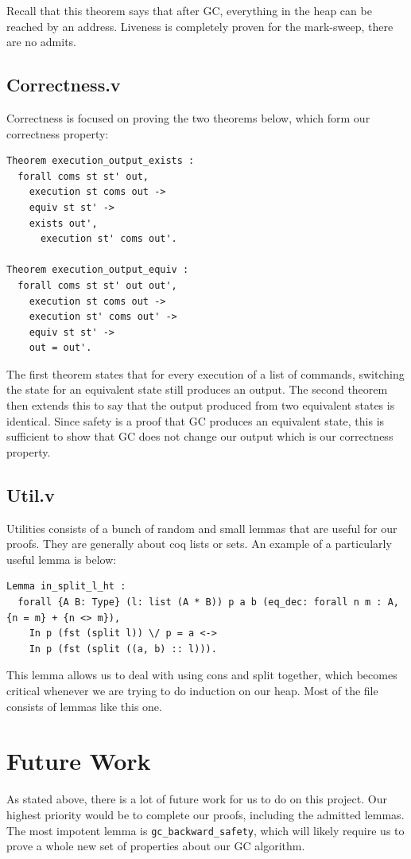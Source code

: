 \documentclass{article}
\begin{document}
Recall that this theorem says that after GC, everything in the heap can be reached by an address. Liveness is completely proven for the mark-sweep, there are no admits.

\subsection{Correctness.v}
Correctness is focused on proving the two theorems below, which form our correctness property:

\begin{lstlisting}
Theorem execution_output_exists :
  forall coms st st' out,
    execution st coms out ->
    equiv st st' ->
    exists out',
      execution st' coms out'.

Theorem execution_output_equiv :
  forall coms st st' out out',
    execution st coms out ->
    execution st' coms out' ->
    equiv st st' ->
    out = out'.
\end{lstlisting}

The first theorem states that for every execution of a list of commands, switching the state for an equivalent state still produces an output. The second theorem then extends this to say that the output produced from two equivalent states is identical. Since safety is a proof that GC produces an equivalent state, this is sufficient to show that GC does not change our output which is our correctness property.

\subsection{Util.v}
Utilities consists of a bunch of random and small lemmas that are useful for our proofs. They are generally about coq lists or sets. An example of a particularly useful lemma is below:

\begin{lstlisting}
Lemma in_split_l_ht :
  forall {A B: Type} (l: list (A * B)) p a b (eq_dec: forall n m : A, {n = m} + {n <> m}),
    In p (fst (split l)) \/ p = a <->
    In p (fst (split ((a, b) :: l))).
\end{lstlisting}

This lemma allows us to deal with using cons and split together, which becomes critical whenever we are trying to do induction on our heap. Most of the file consists of lemmas like this one.

\section{Future Work}
As stated above, there is a lot of future work for us to do on this project. Our highest priority would be to complete our proofs, including the admitted lemmas. The most impotent lemma is \lstinline|gc_backward_safety|, which will likely require us to prove a whole new set of properties about our GC algorithm.
\end{document}

